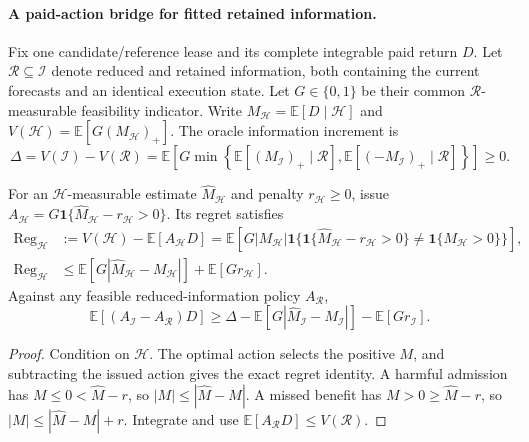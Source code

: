 \paragraph{A paid-action bridge for fitted retained information.}
Fix one candidate/reference lease and its complete integrable paid return $D$.
Let $\mathcal R\subseteq\mathcal I$ denote reduced and retained information,
both containing the current forecasts and an identical execution state.
Let $G\in\{0,1\}$ be their common $\mathcal R$-measurable feasibility indicator.
Write $M_{\mathcal H}=\mathbb E[D\mid\mathcal H]$ and
$V(\mathcal H)=\mathbb E[G(M_{\mathcal H})_+]$.
The oracle information increment is
\begin{equation}
 \Delta=V(\mathcal I)-V(\mathcal R)
 =\mathbb E\!\left[G\min\!\left\{
 \mathbb E[(M_{\mathcal I})_+\mid\mathcal R],
 \mathbb E[(-M_{\mathcal I})_+\mid\mathcal R]\right\}\right]\geq0.
 \label{cjr_oracle_paid_information_gap}
\end{equation}
\begin{proposition}
\label{cjr_fitted_paid_policy_regret}
For an $\mathcal H$-measurable estimate $\widehat M_{\mathcal H}$ and
penalty $r_{\mathcal H}\geq0$, issue
$A_{\mathcal H}=G\mathbf1\{\widehat M_{\mathcal H}-r_{\mathcal H}>0\}$.
Its regret satisfies
\begin{align}
 \operatorname{Reg}_{\mathcal H}
 &:=V(\mathcal H)-\mathbb E[A_{\mathcal H}D]
 =\mathbb E[G|M_{\mathcal H}|\mathbf1\{
 \mathbf1\{\widehat M_{\mathcal H}-r_{\mathcal H}>0\}
 \ne\mathbf1\{M_{\mathcal H}>0\}\}],\nonumber\\
 \operatorname{Reg}_{\mathcal H}
 &\leq\mathbb E[G|\widehat M_{\mathcal H}-M_{\mathcal H}|]
       +\mathbb E[Gr_{\mathcal H}].
 \label{cjr_paid_regret_bound}
\end{align}
Against any feasible reduced-information policy $A_{\mathcal R}$,
\begin{equation}
 \mathbb E[(A_{\mathcal I}-A_{\mathcal R})D]
 \geq\Delta-\mathbb E[G|\widehat M_{\mathcal I}-M_{\mathcal I}|]
             -\mathbb E[Gr_{\mathcal I}].
 \label{cjr_sufficient_fitted_paid_gain}
\end{equation}
\end{proposition}
\begin{proof}
Condition on $\mathcal H$.  The optimal action selects the positive $M$,
and subtracting the issued action gives the exact regret identity.
A harmful admission has $M\leq0<\widehat M-r$, so $|M|\leq|\widehat M-M|$.
A missed benefit has $M>0\geq\widehat M-r$, so
$|M|\leq|\widehat M-M|+r$.  Integrate and use
$\mathbb E[A_{\mathcal R}D]\leq V(\mathcal R)$.
\end{proof}
